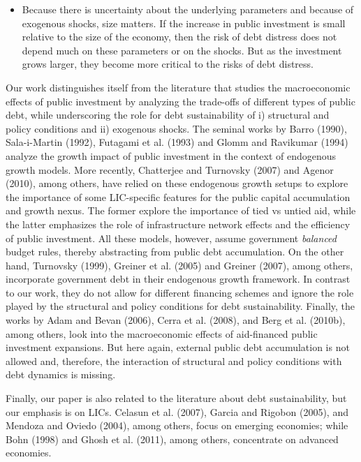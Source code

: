 \documentclass[11pt]{article}
\begin{document}
\begin{itemize}
\item Because there is uncertainty about the underlying parameters and
because of exogenous shocks, size matters. If the increase in public
investment is small relative to the size of the economy, then the risk of
debt distress does not depend much on these parameters or on the shocks. But
as the investment grows larger, they become more critical to the risks of
debt distress.
\end{itemize}

Our work distinguishes itself from the literature that studies the
macroeconomic effects of public investment by analyzing the trade-offs of
different types of public debt, while underscoring the role for debt
sustainability of i) structural and policy conditions and ii) exogenous
shocks. The seminal works by Barro (1990), Sala-i-Martin (1992), Futagami et
al. (1993) and Glomm and Ravikumar (1994) analyze the growth impact of
public investment in the context of endogenous growth models. More recently,
Chatterjee and Turnovsky (2007) and Agenor (2010), among others, have relied
on these endogenous growth setups to explore the importance of some
LIC-specific features for the public capital accumulation and growth nexus.
The former explore the importance of tied vs untied aid, while the latter
emphasizes the role of infrastructure network effects and the efficiency of
public investment. All these models, however, assume government \textit{%
balanced} budget rules, thereby abstracting from public debt accumulation.
On the other hand, Turnovsky (1999), Greiner et al. (2005) and Greiner
(2007), among others, incorporate government debt in their endogenous growth
framework. In contrast to our work, they do not allow for different
financing schemes and ignore the role played by the structural and policy
conditions for debt sustainability. Finally, the works by Adam and Bevan
(2006), Cerra et al. (2008), and Berg et al. (2010b), among others, look
into the macroeconomic effects of aid-financed public investment expansions.
But here again, external public debt accumulation is not allowed and,
therefore, the interaction of structural and policy conditions with debt
dynamics is missing.

Finally, our paper is also related to the literature about debt
sustainability, but our emphasis is on LICs. Celasun et al. (2007), Garcia
and Rigobon (2005), and Mendoza and Oviedo (2004), among others, focus on
emerging economies; while Bohn (1998) and Ghosh et al. (2011), among others,
concentrate on advanced economies.
\end{document}
